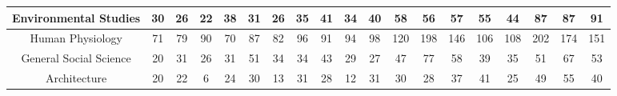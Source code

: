 \documentclass[10pt]{article}
\begin{document}
\begin{landscape}
\begin{longtable}[c]{|ccccccccccccccccccc|}
	\multicolumn{1}{|c|}{Environmental Studies}                      & \multicolumn{1}{c|}{30}         & \multicolumn{1}{c|}{26}         & \multicolumn{1}{c|}{22}         & \multicolumn{1}{c|}{38}         & \multicolumn{1}{c|}{31}         & \multicolumn{1}{c|}{26}         & \multicolumn{1}{c|}{35}         & \multicolumn{1}{c|}{41}         & \multicolumn{1}{c|}{34}         & \multicolumn{1}{c|}{40}         & \multicolumn{1}{c|}{58}         & \multicolumn{1}{c|}{56}         & \multicolumn{1}{c|}{57}         & \multicolumn{1}{c|}{55}         & \multicolumn{1}{c|}{44}         & \multicolumn{1}{c|}{87}         & \multicolumn{1}{c|}{87}         & 91         \\ \hline
	\multicolumn{1}{|c|}{Human Physiology}                           & \multicolumn{1}{c|}{71}         & \multicolumn{1}{c|}{79}         & \multicolumn{1}{c|}{90}         & \multicolumn{1}{c|}{70}         & \multicolumn{1}{c|}{87}         & \multicolumn{1}{c|}{82}         & \multicolumn{1}{c|}{96}         & \multicolumn{1}{c|}{91}         & \multicolumn{1}{c|}{94}         & \multicolumn{1}{c|}{98}         & \multicolumn{1}{c|}{120}        & \multicolumn{1}{c|}{198}        & \multicolumn{1}{c|}{146}        & \multicolumn{1}{c|}{106}        & \multicolumn{1}{c|}{108}        & \multicolumn{1}{c|}{202}        & \multicolumn{1}{c|}{174}        & 151        \\ \hline
	\multicolumn{1}{|c|}{General Social Science}                     & \multicolumn{1}{c|}{20}         & \multicolumn{1}{c|}{31}         & \multicolumn{1}{c|}{26}         & \multicolumn{1}{c|}{31}         & \multicolumn{1}{c|}{51}         & \multicolumn{1}{c|}{34}         & \multicolumn{1}{c|}{34}         & \multicolumn{1}{c|}{43}         & \multicolumn{1}{c|}{29}         & \multicolumn{1}{c|}{27}         & \multicolumn{1}{c|}{47}         & \multicolumn{1}{c|}{77}         & \multicolumn{1}{c|}{58}         & \multicolumn{1}{c|}{39}         & \multicolumn{1}{c|}{35}         & \multicolumn{1}{c|}{51}         & \multicolumn{1}{c|}{67}         & 53         \\ \hline
	\multicolumn{1}{|c|}{Architecture}                               & \multicolumn{1}{c|}{20}         & \multicolumn{1}{c|}{22}         & \multicolumn{1}{c|}{6}          & \multicolumn{1}{c|}{24}         & \multicolumn{1}{c|}{30}         & \multicolumn{1}{c|}{13}         & \multicolumn{1}{c|}{31}         & \multicolumn{1}{c|}{28}         & \multicolumn{1}{c|}{12}         & \multicolumn{1}{c|}{31}         & \multicolumn{1}{c|}{30}         & \multicolumn{1}{c|}{28}         & \multicolumn{1}{c|}{37}         & \multicolumn{1}{c|}{41}         & \multicolumn{1}{c|}{25}         & \multicolumn{1}{c|}{49}         & \multicolumn{1}{c|}{55}         & 40         \\ \hline

\end{longtable}
\end{landscape}
\end{document}
